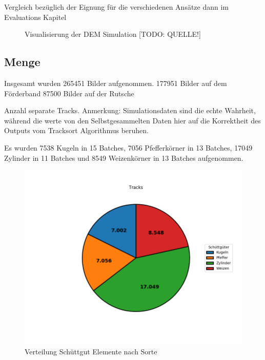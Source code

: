 Vergleich bezüglich der Eignung für die verschiedenen Ansätze dann im Evaluations Kapitel

\begin{figure}
    \centering
	\caption{Visualisierung der DEM Simulation [TODO: QUELLE!]}
	\label{fig:DEMSimulation}
\end{figure}


\subsection{Menge}

Insgesamt wurden 265451 Bilder aufgenommen.
177951 Bilder auf dem Förderband
87500 Bilder auf der Rutsche


Anzahl separate Tracks.
Anmerkung: Simulationsdaten sind die echte Wahrheit, während die werte von den Selbstgesammelten Daten hier 
auf die Korrektheit des Outputs vom Tracksort Algorithmus beruhen. 

Es wurden 
7538 Kugeln in 15 Batches,
7056 Pfefferkörner in 13 Batches,
17049 Zylinder in 11 Batches
und 8549 Weizenkörner in 13 Batches aufgenommen.


\begin{figure}
    \centering
    \includegraphics[width=\textwidth]{img/scaledPieChart-trimmed}
    \caption{Verteilung Schüttgut Elemente nach Sorte}
    \label{piechartSchuettgut}
\end{figure}


